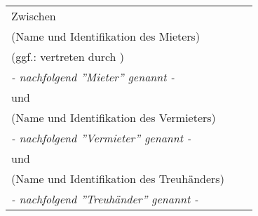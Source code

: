 \documentclass[parskip=half]{scrreprt}
\begin{document}
 
  

\begin{tabular}{p{15cm}p{.5cm}l}
Zwischen \dotfill  \\ 
(Name und Identifikation des Mieters) \\  
\medskip(ggf.: vertreten durch \dotfill)\\ 
\medskip \hfill \textit{- nachfolgend ''Mieter'' genannt -}\\ 
\bigskip und \dotfill\\ 
(Name und Identifikation des Vermieters) \\  
\medskip \hfill \textit{- nachfolgend ''Vermieter'' genannt -} \\ 
\bigskip und \dotfill\\ 
(Name und Identifikation des Treuhänders) \\  
\medskip \hfill \textit{- nachfolgend ''Treuhänder'' genannt -} \\ 
\end{tabular}%
\end{document}
